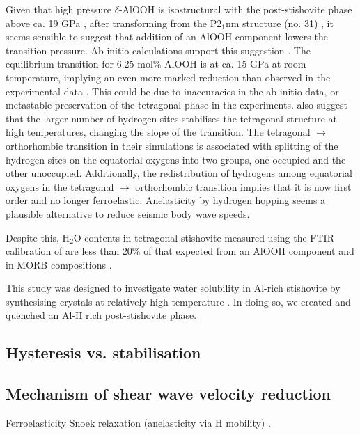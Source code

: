 \documentclass[review]{elsarticle}
\begin{document}
Given that high pressure $\delta$-AlOOH is isostructural with the post-stishovite phase above ca. 19 GPa \citep{SKVO2008, KSN2014}, after transforming from the P2$_1$nm structure (no. 31) \citep{SOK2000, KKSOK2006, VSKOS2007}, it seems sensible to suggest that addition of an AlOOH component lowers the transition pressure. Ab initio calculations support this suggestion \citep{UKHRW2015}. The equilibrium transition for 6.25 mol\% AlOOH is at ca. 15 GPa at room temperature, implying an even more marked reduction than observed in the experimental data \citep{Lakshtanovetal2007}. This could be due to inaccuracies in the ab-initio data, or metastable preservation of the tetragonal phase in the experiments. \cite{UKHRW2015} also suggest that the larger number of hydrogen sites stabilises the tetragonal structure at high temperatures, changing the slope of the transition. The tetragonal $\rightarrow$ orthorhombic transition in their simulations is associated with splitting of the hydrogen sites on the equatorial oxygens into two groups, one occupied and the other unoccupied.  Additionally, the redistribution of hydrogens among equatorial oxygens in the tetragonal $\rightarrow$ orthorhombic transition implies that it is now first order and no longer ferroelastic. Anelasticity by hydrogen hopping seems a plausible alternative to reduce seismic body wave speeds. %


Despite this, H$_2$O contents in tetragonal stishovite measured using the FTIR calibration of \cite{PMH1993} are less than 20\% of that expected from an AlOOH component \citep{PBJ2003, BBB2006, LKSOLBI2007} and in MORB compositions \citep{CK2002}.

This study was designed to investigate water solubility in Al-rich stishovite by synthesising crystals at relatively high temperature \citep{Ono1999}. In doing so, we created and quenched an Al-H rich post-stishovite phase.


\subsection{Hysteresis vs. stabilisation}
\citep{UKHRW2015}


\subsection{Mechanism of shear wave velocity reduction}
Ferroelasticity \citep{CHM2000}
Snoek relaxation (anelasticity via H mobility) \citep{Snoek1941, NB1972, MCDBT2007}.
\end{document}
